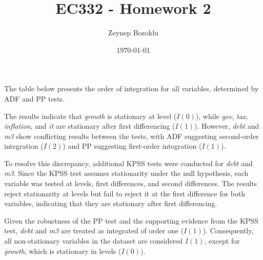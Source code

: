 \documentclass[a4paper,12pt]{article}
\title{EC332 - Homework 2}
\author{Zeynep Bozoklu}
\date{\today}
\begin{document}
\maketitle

\section{}
The table below presents the order of integration for all variables, determined by ADF and PP tests.



The results indicate that \textit{growth} is stationary at level (\(I(0)\)), while \textit{gov}, \textit{tax}, \textit{inflation}, and \textit{it} are stationary after first differencing (\(I(1)\)). However, \textit{debt} and \textit{m3} show conflicting results between the tests, with ADF suggesting second-order integration (\(I(2)\)) and PP suggesting first-order integration (\(I(1)\)). 

To resolve this discrepancy, additional KPSS tests were conducted for \textit{debt} and \textit{m3}. Since the KPSS test assumes stationarity under the null hypothesis, each variable was tested at levels, first differences, and second differences. The results reject stationarity at levels but fail to reject it at the first difference for both variables, indicating that they are stationary after first differencing.



Given the robustness of the PP test and the supporting evidence from the KPSS test, \textit{debt} and \textit{m3} are treated as integrated of order one (\(I(1)\)). Consequently, all non-stationary variables in the dataset are considered \(I(1)\), except for \textit{growth}, which is stationary in levels (\(I(0)\)).
\end{document}
